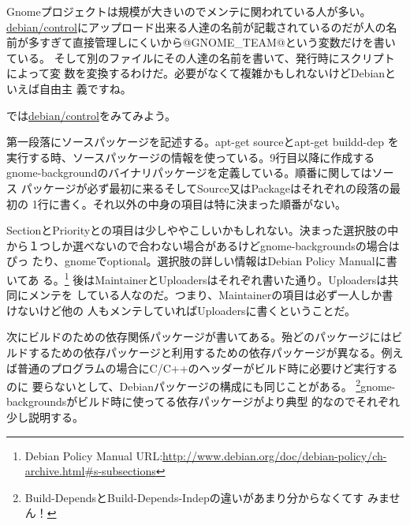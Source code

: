 \documentclass[mingoth,a4paper]{jsarticle}
\begin{document}
Gnomeプロジェクトは規模が大きいのでメンテに関われている人が多い。
\url{debian/control}にアップロード出来る人達の名前が記載されているのだが人の名
前が多すぎて直接管理しにくいから@GNOME\_TEAM@という変数だけを書いている。
そして別のファイルにその人達の名前を書いて、発行時にスクリプトによって変
数を変換するわけだ。必要がなくて複雑かもしれないけどDebianといえば自由主
義ですね。

では\url{debian/control}をみてみよう。

第一段落にソースパッケージを記述する。apt-get sourceとapt-get buildd-dep
を実行する時、ソースパッケージの情報を使っている。9行目以降に作成する
gnome-backgroundのバイナリパッケージを定義している。順番に関してはソース
パッケージが必ず最初に来るそしてSource又はPackageはそれぞれの段落の最初の
1行に書く。それ以外の中身の項目は特に決まった順番がない。

SectionとPriorityとの項目は少しややこしいかもしれない。決まった選択肢の中
から１つしか選べないので合わない場合があるけどgnome-backgroundsの場合はぴっ
たり、gnomeでoptional。選択肢の詳しい情報はDebian Policy Manualに書いてあ
る。\footnote{Debian Policy Manual
URL:\url{http://www.debian.org/doc/debian-policy/ch-archive.html\#s-subsections}}
後はMaintainerとUploadersはそれぞれ書いた通り。Uploadersは共同にメンテを
している人なのだ。つまり、Maintainerの項目は必ず一人しか書けないけど他の
人もメンテしていればUploadersに書くということだ。

次にビルドのための依存関係パッケージが書いてある。殆どのパッケージにはビ
ルドするための依存パッケージと利用するための依存パッケージが異なる。例え
ば普通のプログラムの場合にC/C++のヘッダーがビルド時に必要けど実行するのに
要らないとして、Debianパッケージの構成にも同じことがある。
\footnote{Build-DependsとBuild-Depends-Indepの違いがあまり分からなくてす
みません！}gnome-backgroundsがビルド時に使ってる依存パッケージがより典型
的なのでそれぞれ少し説明する。
\end{document}
